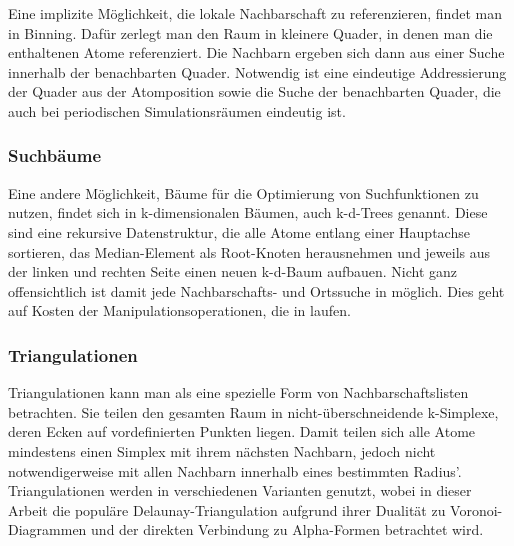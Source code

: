 Eine implizite Möglichkeit, die lokale Nachbarschaft zu referenzieren, findet man in Binning.
Dafür zerlegt man den Raum in kleinere Quader, in denen man die enthaltenen Atome referenziert.
Die Nachbarn ergeben sich dann aus einer Suche innerhalb der benachbarten Quader.
Notwendig ist eine eindeutige Addressierung der Quader aus der Atomposition sowie die Suche der benachbarten Quader, die auch bei periodischen Simulationsräumen eindeutig ist.

\subsubsection{Suchbäume}

Eine andere Möglichkeit, Bäume für die Optimierung von Suchfunktionen zu nutzen, findet sich in k-dimensionalen Bäumen, auch k-d-Trees genannt.
Diese sind eine rekursive Datenstruktur, die alle Atome entlang einer Hauptachse sortieren, das Median-Element als Root-Knoten herausnehmen und jeweils aus der linken und rechten Seite einen neuen k-d-Baum aufbauen.
Nicht ganz offensichtlich ist damit jede Nachbarschafts- und Ortssuche in  möglich.
Dies geht auf Kosten der Manipulationsoperationen, die in  laufen.

\subsubsection{Triangulationen}

Triangulationen kann man als eine spezielle Form von Nachbarschaftslisten betrachten.
Sie teilen den gesamten Raum in nicht-überschneidende k-Simplexe, deren Ecken auf vordefinierten Punkten liegen.
Damit teilen sich alle Atome mindestens einen Simplex mit ihrem nächsten Nachbarn, jedoch nicht notwendigerweise mit allen Nachbarn innerhalb eines bestimmten Radius'.
Triangulationen werden in verschiedenen Varianten genutzt, wobei in dieser Arbeit die populäre Delaunay-Triangulation aufgrund ihrer Dualität zu Voronoi-Diagrammen und der direkten Verbindung zu Alpha-Formen betrachtet wird.

